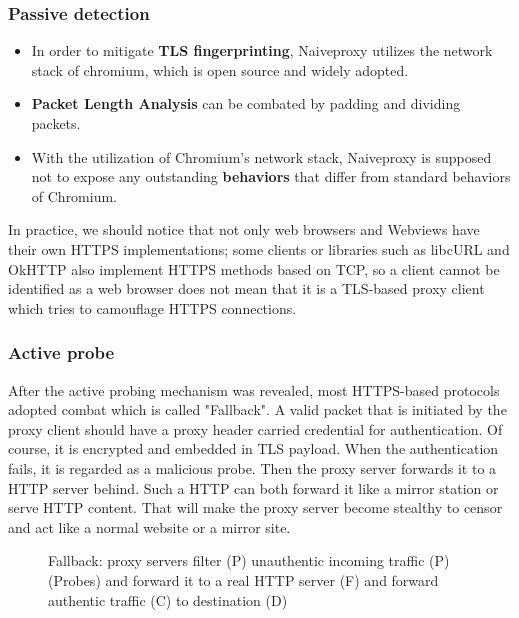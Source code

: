 \documentclass[conference]{IEEEtran}
\begin{document}
\subsubsection{Passive detection}
\begin{itemize}
    \item In order to mitigate \textbf{TLS fingerprinting}, Naiveproxy utilizes the network stack of chromium, which is open source and widely adopted. 
    \item \textbf{Packet Length Analysis} can be combated by padding and dividing packets.
    \item  With the utilization of Chromium's network stack, Naiveproxy is supposed not to expose any outstanding \textbf{behaviors} that differ from standard behaviors of Chromium.
\end{itemize}

In practice, we should notice that not only web browsers and Webviews have their own HTTPS implementations; some clients or libraries such as libcURL and OkHTTP also implement HTTPS methods based on TCP, so a client cannot be identified as a web browser does not mean that it is a TLS-based proxy client which tries to camouflage HTTPS connections.


\subsubsection{Active probe}\label{sec:apc}
After the active probing mechanism was revealed, most HTTPS-based protocols adopted combat which is called "Fallback". A valid packet that is initiated by the proxy client should have a proxy header carried credential for authentication. Of course, it is encrypted and embedded in TLS payload. When the authentication fails, it is regarded as a malicious probe. Then the proxy server forwards it to a HTTP server behind. Such a HTTP can both forward it like a mirror station or serve  HTTP content. That will make the proxy server become stealthy to censor and act like a normal website or a mirror site.

\begin{figure}[!h]
    \centering
    
    \caption{Fallback: proxy servers filter (P) unauthentic incoming traffic (P) (Probes) and forward it to a real HTTP server (F) and forward authentic traffic (C) to destination (D)}
    \label{fig:fallback}
\end{figure}
\end{document}
